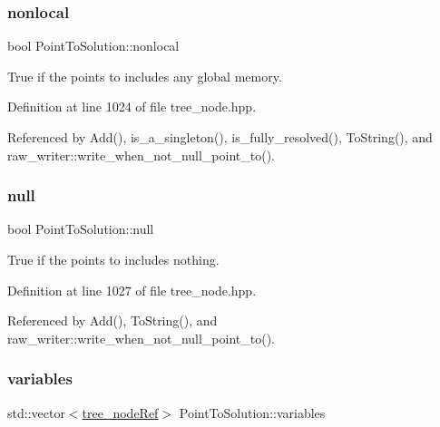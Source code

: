 \subsubsection{\texorpdfstring{nonlocal}{nonlocal}}
{\footnotesize\ttfamily bool Point\+To\+Solution\+::nonlocal}



True if the points to includes any global memory. 



Definition at line 1024 of file tree\+\_\+node.\+hpp.



Referenced by Add(), is\+\_\+a\+\_\+singleton(), is\+\_\+fully\+\_\+resolved(), To\+String(), and raw\+\_\+writer\+::write\+\_\+when\+\_\+not\+\_\+null\+\_\+point\+\_\+to().

\mbox{\label{structPointToSolution_abedd916fbd8ebd406bf80ff4bbcef7eb}} 
\subsubsection{\texorpdfstring{null}{null}}
{\footnotesize\ttfamily bool Point\+To\+Solution\+::null}



True if the points to includes nothing. 



Definition at line 1027 of file tree\+\_\+node.\+hpp.



Referenced by Add(), To\+String(), and raw\+\_\+writer\+::write\+\_\+when\+\_\+not\+\_\+null\+\_\+point\+\_\+to().

\mbox{\label{structPointToSolution_af6e932495118956b3caabcfdd62fe1c2}} 
\subsubsection{\texorpdfstring{variables}{variables}}
{\footnotesize\ttfamily std\+::vector$<$\hyperlink{tree__node_8hpp_a6ee377554d1c4871ad66a337eaa67fd5}{tree\+\_\+node\+Ref}$>$ Point\+To\+Solution\+::variables}



